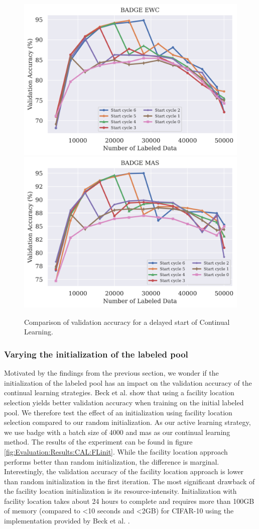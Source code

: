 \begin{figure}[h]
    \centering
    \includegraphics[width=0.45\linewidth]{images/results_CAL/delayed_start_badge_ewc.png} \hfill
    \includegraphics[width=0.45\linewidth]{images/results_CAL/delayed_start_badge_mas.png}
    \caption{Comparison of validation accuracy for a delayed start of Continual Learning.}
    \label{fig:Evaluation:Results:CAL:DelayedStart}
\end{figure}

\subsubsection{Varying the initialization of the labeled pool}
\label{sec:Evaluation:Results:CAL:Initialization}
Motivated by the findings from the previous section, we wonder if the initialization of the labeled pool has an impact on the validation accuracy of the continual learning strategies.
Beck et al. \cite{beck2021effective} show that using a facility location selection \cite{iyer2021submodular} yields better validation accuracy when training on the initial labeled pool.
We therefore test the effect of an initialization using facility location selection compared to our random initialization. As our active learning strategy, we use \gls{badge} with
a batch size of 4000 and \gls{mas} as our continual learning method. The results of the experiment can be found in figure \ref{fig:Evaluation:Results:CAL:FLinit}. While the facility
location approach performs better than random initialization, the difference is marginal. Interestingly, the validation accuracy of the facility location approach is lower than
random initialization in the first iteration. The most significant drawback of the facility location initialization is its resource-intensity. Initialization with facility
location takes about 24 hours to complete and requires more than 100GB of memory (compared to <10 seconds and <2GB) for CIFAR-10 using the implementation provided by Beck et al.
\cite{beck2021effective}. \par

